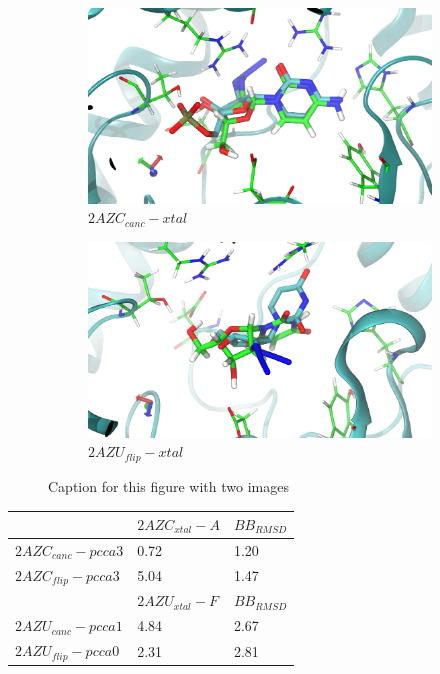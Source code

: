 \documentclass[fleqn,10pt]{wlscirep}
\begin{document}
\begin{figure}[!ht]
\centering
\begin{subfigure}{.5\textwidth}
  \centering
  \includegraphics[width=.9\linewidth]{xtal/2AZC_canc-xtal_front.pdf}
  \caption{$2AZC_{canc}-xtal$}
  \label{fig:2AZC-xtal}
\end{subfigure}%
\begin{subfigure}{.5\textwidth}
  \centering
  \includegraphics[width=.9\linewidth]{xtal/2AZU_flip-xtal_front.pdf}
  \caption{$2AZU_{flip}-xtal$}
  \label{fig:2AZU-xtal}
\end{subfigure}
\caption{Caption for this figure with two images}
\label{fig:xtal}
\end{figure}


\begin{table}[!ht]
\begin{tabular}{|l|l|l|}
\hline
                          & \textbf{$2AZC_{xtal}-A$} & \textbf{$BB_{RMSD}$} \\ \hline
\textbf{$2AZC_{canc}-pcca3$} & 0.72                  & 1.20             \\ \hline
\textbf{$2AZC_{flip}-pcca3$} & 5.04                  & 1.47              \\ \hline
\textbf{}                 & \textbf{$2AZU_{xtal}-F$} & \textbf{$BB_{RMSD}$} \\ \hline
\textbf{$2AZU_{canc}-pcca1$} & 4.84                  & 2.67             \\ \hline
\textbf{$2AZU_{flip}-pcca0$} & 2.31                  & 2.81              \\ \hline
\end{tabular}
\end{table}
\end{document}
